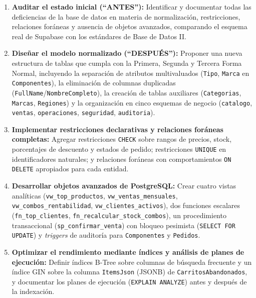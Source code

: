\begin{enumerate}
  \item \textbf{Auditar el estado inicial (``ANTES''):} Identificar y documentar todas las deficiencias de la base de datos en materia de normalización, restricciones, relaciones foráneas y ausencia de objetos avanzados, comparando el esquema real de Supabase con los estándares de Base de Datos II.

  \item \textbf{Diseñar el modelo normalizado (``DESPUÉS''):} Proponer una nueva estructura de tablas que cumpla con la Primera, Segunda y Tercera Forma Normal, incluyendo la separación de atributos multivaluados (\texttt{Tipo}, \texttt{Marca} en \texttt{Componentes}), la eliminación de columnas duplicadas (\texttt{FullName}/\texttt{NombreCompleto}), la creación de tablas auxiliares (\texttt{Categorias}, \texttt{Marcas}, \texttt{Regiones}) y la organización en cinco esquemas de negocio (\texttt{catalogo}, \texttt{ventas}, \texttt{operaciones}, \texttt{seguridad}, \texttt{auditoria}).

  \item \textbf{Implementar restricciones declarativas y relaciones foráneas completas:} Agregar restricciones \texttt{CHECK} sobre rangos de precios, stock, porcentajes de descuento y estados de pedido; restricciones \texttt{UNIQUE} en identificadores naturales; y relaciones foráneas con comportamientos \texttt{ON DELETE} apropiados para cada entidad.

  \item \textbf{Desarrollar objetos avanzados de PostgreSQL:} Crear cuatro vistas analíticas (\texttt{vw\_top\_productos}, \texttt{vw\_ventas\_mensuales}, \texttt{vw\_combos\_rentabilidad}, \texttt{vw\_clientes\_activos}), dos funciones escalares (\texttt{fn\_top\_clientes}, \texttt{fn\_recalcular\_stock\_combos}), un procedimiento transaccional (\texttt{sp\_confirmar\_venta}) con bloqueo pesimista (\texttt{SELECT FOR UPDATE}) y \textit{triggers} de auditoría para \texttt{Componentes} y \texttt{Pedidos}.

  \item \textbf{Optimizar el rendimiento mediante índices y análisis de planes de ejecución:} Definir índices B-Tree sobre columnas de búsqueda frecuente y un índice GIN sobre la columna \texttt{ItemsJson} (JSONB) de \texttt{CarritosAbandonados}, y documentar los planes de ejecución (\texttt{EXPLAIN ANALYZE}) antes y después de la indexación.
\end{enumerate}
